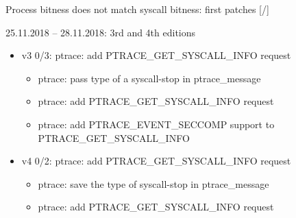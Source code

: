 \documentclass[unicode,aspectratio=169]{beamer}
\begin{document}
\begin{frame}{Process bitness does not match syscall bitness: first patches \hfill [\insertframenumber/\inserttotalframenumber]}
\Large
\begin{block}{25.11.2018 -- 28.11.2018: 3rd and 4th editions}
\begin{itemize}
	\item v3 0/3: ptrace: add PTRACE\_GET\_SYSCALL\_INFO request
	\begin{itemize}
		\item ptrace: pass type of a syscall-stop in ptrace\_message
		\item ptrace: add PTRACE\_GET\_SYSCALL\_INFO request
		\item ptrace: add PTRACE\_EVENT\_SECCOMP support to PTRACE\_GET\_SYSCALL\_INFO
	\end{itemize}
	\item v4 0/2: ptrace: add PTRACE\_GET\_SYSCALL\_INFO request
	\begin{itemize}
		\item ptrace: save the type of syscall-stop in ptrace\_message
		\item ptrace: add PTRACE\_GET\_SYSCALL\_INFO request
	\end{itemize}
\end{itemize}
\end{block}
\end{frame}
\end{document}
